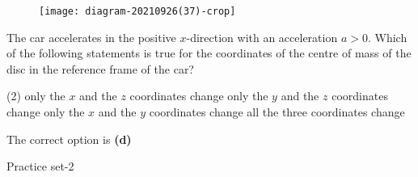 \begin{enumerate}
\begin{minipage}{\textwidth}
	\begin{figure}[H]
		\centering
		\texttt{[image: diagram-20210926(37)-crop]}
	\end{figure}
	The car accelerates in the positive $x$-direction with an acceleration $a>0 .$ Which of the following statements is true for the coordinates of the centre of mass of the disc in the reference frame of the car?
\end{minipage}
\begin{tasks}(2)
	\task[\textbf{A.}] only the $x$ and the $z$ coordinates change
	\task[\textbf{B.}]only the $y$ and the $z$ coordinates change
	\task[\textbf{C.}]only the $x$ and the $y$ coordinates change
	\task[\textbf{D.}]all the three coordinates change
\end{tasks}
\begin{answer}
The correct option is \textbf{(d)}	
\end{answer}
\end{enumerate}
\newpage
\begin{abox}
	Practice set-2
	\end{abox}
